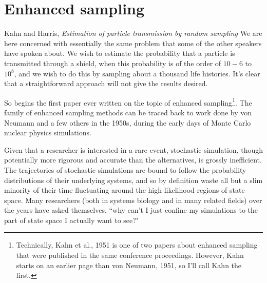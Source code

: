 


\section{Enhanced sampling}

\begin{chapquote}{Kahn and Harris, \textit{Estimation of particle transmission by random sampling}\cite{Kahn:1951es}}
We are here concerned with essentially the same problem that some of the other speakers have spoken about. We wish to estimate the probability that a particle is transmitted through a shield, when this probability is of the order of $10-6$ to $10^8$, and we wish to do this by sampling about a thousand life histories. It's clear that a straightforward approach will not give the results desired.
\end{chapquote}

So begins the first paper ever written on the topic of enhanced sampling\footnote{Technically, Kahn et al., 1951\cite{Kahn:1951es} is one of two papers about enhanced sampling that were published in the same conference proceedings. However, Kahn starts on an earlier page than von Neumann, 1951\cite{vonNeumann:1951fe}, so I'll call Kahn the first.}. The family of enhanced sampling methods can be traced back to work done by von Neumann\cite{vonNeumann:1951fe} and a few others\cite{Kahn:1953az,Forsythe:1972cf} in the 1950s, during the early days of Monte Carlo nuclear physics simulations.

Given that a researcher is interested in a rare event, stochastic simulation, though potentially more rigorous and accurate than the alternatives, is grossly inefficient. The trajectories of stochastic simulations are bound to follow the probability distributions of their underlying systems, and so by definition waste all but a slim minority of their time fluctuating around the high-likelihood regions of state space. Many researchers (both in systems biology and in many related fields\cite{Huber:1996dn,Dellago:1998kw,vanErp:2005jua,Bernardi:2015ij}) over the years have asked themselves, ``why can't I just confine my simulations to the part of state space I actually want to see?"

